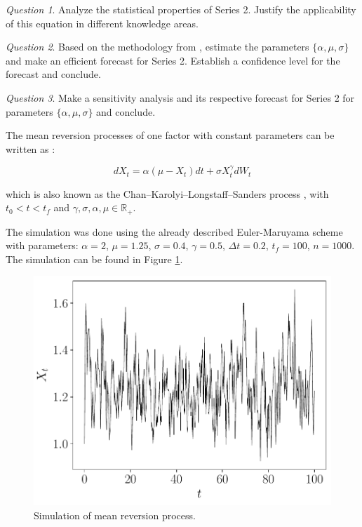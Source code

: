 \documentclass[11pt]{article}
\theoremstyle{definition}
\theoremstyle{remark}
\theoremstyle{remark}
\newtheorem{question}{Question}
\newcommand{\R}{{\mathbb{R}}}
\begin{document}
\begin{question}
  Analyze the statistical properties of Series 2. Justify the
  applicability of this equation in different knowledge areas.
\end{question}

\begin{question}
  Based on the methodology from \parencite{marin2013}, estimate the
  parameters $\{\alpha, \mu, \sigma\}$ and make an efficient forecast
  for Series 2. Establish a confidence level for the forecast and
  conclude.
\end{question}

\begin{question}
  Make a sensitivity analysis and its respective forecast for Series 2
  for parameters $\{\alpha, \mu, \sigma\}$ and conclude.
\end{question}

The mean reversion processes of one factor with constant parameters
can be written as \parencite{marin2013}:

\begin{equation*}
  dX_t = \alpha (\mu - X_t) dt + \sigma X_t^\gamma dW_t
\end{equation*}

which is also known as the Chan–Karolyi–Longstaff–Sanders process
\parencite{chan1992}, with $t_0 < t < t_f$ and
$\gamma, \sigma, \alpha, \mu \in \R_+$.

The simulation was done using the already described Euler-Maruyama scheme
with parameters: $\alpha = 2$, $\mu = 1.25$, $\sigma = 0.4$, $\gamma = 0.5$,
$\Delta t = 0.2$, $t_f = 100$, $n = 1000$. The simulation can be found in Figure
\ref{fig:series2}.

\begin{figure}[t]
  \centering
  \includegraphics[scale=.5]{ornstein_serie2.pdf}
  \caption{Simulation of mean reversion process.}
  \label{fig:series2}
\end{figure}
\end{document}
